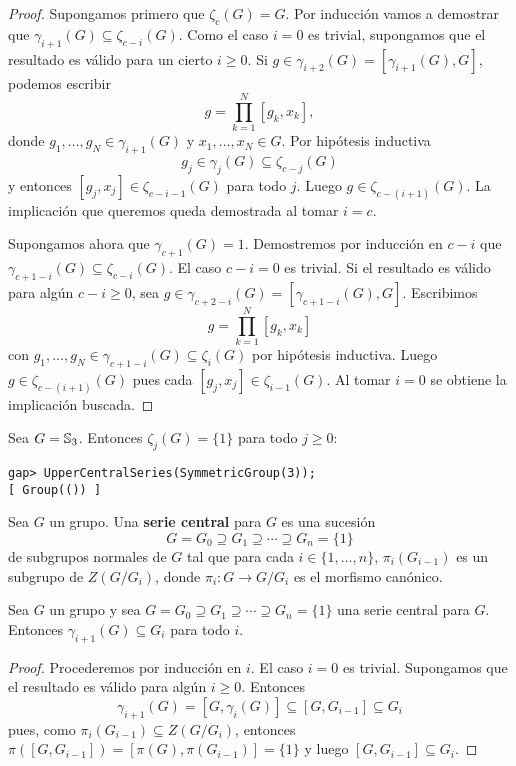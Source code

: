\begin{proof}
	Supongamos primero que $\zeta_c(G)=G$. Por inducción vamos a demostrar
	que $\gamma_{i+1}(G)\subseteq\zeta_{c-i}(G)$.  Como el caso $i=0$ es
	trivial, supongamos que el resultado es válido para un cierto $i\geq0$. Si
	$g\in\gamma_{i+2}(G)=[\gamma_{i+1}(G),G]$, podemos escribir 
	\[
	g=\prod_{k=1}^N [g_k,x_k],
	\]
	donde $g_1,\dots,g_N\in\gamma_{i+1}(G)$ y $x_1,\dots,x_N\in G$. Por
	hipótesis inductiva 
	\[
	g_j\in\gamma_j(G)\subseteq\zeta_{c-j}(G)
	\]
	y entonces $[g_j,x_j]\in\zeta_{c-i-1}(G)$ para todo $j$. Luego
	$g\in\zeta_{c-(i+1)}(G)$. La implicación que queremos queda demostrada
	al tomar $i=c$. 

	Supongamos ahora que $\gamma_{c+1}(G)=1$. Demostremos por inducción en $c-i$ que
	$\gamma_{c+1-i}(G)\subseteq\zeta_{c-i}(G)$. El caso $c-i=0$ es trivial. Si el
	resultado es válido para algún $c-i\geq0$, sea
	$g\in\gamma_{c+2-i}(G)=[\gamma_{c+1-i}(G),G]$. Escribimos
	\[
		g=\prod_{k=1}^N[g_k,x_k]
	\]
	con $g_1,\dots,g_N\in\gamma_{c+1-i}(G)\subseteq\zeta_{i}(G)$ por
	hipótesis inductiva. Luego $g\in \zeta_{c-(i+1)}(G)$ pues cada
	$[g_j,x_j]\in\zeta_{i-1}(G)$. Al tomar $i=0$ se obtiene la implicación
	buscada.
\end{proof}

\begin{example}
	Sea $G=\mathbb{S}_3$. Entonces $\zeta_j(G)=\{1\}$ para todo $j\geq 0$: 
	\begin{lstlisting}
gap> UpperCentralSeries(SymmetricGroup(3));
[ Group(()) ]
	\end{lstlisting}
\end{example}

\begin{definition}
	Sea $G$ un grupo. Una \textbf{serie central} para $G$ es una sucesión 
	\[
		G=G_0\supseteq G_1\supseteq\cdots\supseteq G_n=\{1\}
	\]
	de subgrupos normales de $G$ tal que para cada $i\in\{1,\dots,n\}$, 
	$\pi_i(G_{i-1})$ es un subgrupo de $Z(G/G_i)$, donde $\pi_i\colon G\to
	G/G_i$ es el morfismo canónico.
\end{definition}

\begin{lemma}
	\label{lemma:serie_central}
	Sea $G$ un grupo y sea $G=G_0\supseteq G_1\supseteq\cdots\supseteq G_n=\{1\}$
	una serie central para $G$. Entonces $\gamma_{i+1}(G)\subseteq G_i$ para
	todo $i$.
\end{lemma}

\begin{proof}
	Procederemos por inducción en $i$. El caso $i=0$ es trivial.  Supongamos
	que el resultado es válido para algún $i\geq0$. Entonces 
	\[
	\gamma_{i+1}(G)=[G,\gamma_i(G)]\subseteq [G,G_{i-1}]\subseteq G_i
	\]
	pues, como $\pi_i(G_{i-1})\subseteq Z(G/G_{i})$, entonces
	$\pi([G,G_{i-1}])=[\pi(G),\pi(G_{i-1})]=\{1\}$ y luego $[G,G_{i-1}]\subseteq
	G_i$.
\end{proof}

